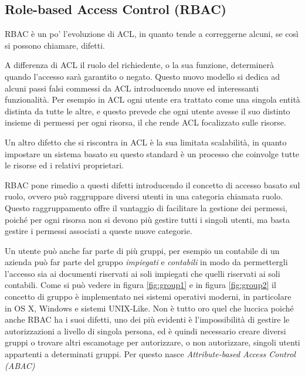 \subsection*{Role-based Access Control (RBAC)} %
\label{sub:role_based_access_control}

RBAC è un po' l'evoluzione di ACL, in quanto tende a correggerne alcuni, se così si possono chiamare, difetti.\\ \par
A differenza di ACL il ruolo del richiedente, o la sua funzione, determinerà quando l'accesso sarà garantito o negato.
Questo nuovo modello si dedica ad alcuni passi falsi commessi da ACL introducendo nuove ed interessanti funzionalità. Per esempio in ACL ogni utente era trattato come una singola entità distinta da tutte le altre, e questo prevede che ogni utente avesse il suo distinto insieme di permessi per ogni risorsa, il che rende ACL focalizzato sulle risorse.\\ \par
Un altro difetto che si riscontra in ACL è la sua limitata scalabilità, in quanto 
impostare un sistema basato su questo standard è un processo che coinvolge tutte le risorse ed i relativi proprietari.\\ \par
RBAC pone rimedio a questi difetti introducendo il concetto di accesso basato sul ruolo, ovvero può raggruppare diversi utenti in una categoria chiamata ruolo. 
Questo raggruppamento offre il vantaggio di facilitare la gestione dei permessi, poiché per ogni risorsa non si devono più gestire tutti i singoli utenti, ma basta gestire i permessi associati a queste nuove categorie.\\ \par
Un utente può anche far parte di più gruppi, per esempio un contabile di un azienda può far parte del gruppo \textit{impiegati} e \textit{contabili} in modo da permettergli l'accesso sia ai documenti riservati ai soli impiegati che quelli riservati ai soli contabili.
Come si può vedere in figura \ref{fig:group1} e in figura \ref{fig:group2} il concetto di gruppo è implementato nei sistemi operativi moderni, in particolare in OS X, Windows e sistemi UNIX-Like.
Non è tutto oro quel che luccica poiché anche RBAC ha i suoi difetti, uno dei più evidenti è l'impossibilità di gestire le autorizzazioni a livello di singola persona, ed è quindi necessario creare diversi gruppi o trovare altri escamotage per autorizzare, o non autorizzare, singoli utenti appartenti a determinati gruppi. Per questo nasce \textit{Attribute-based Access Control (ABAC)}

